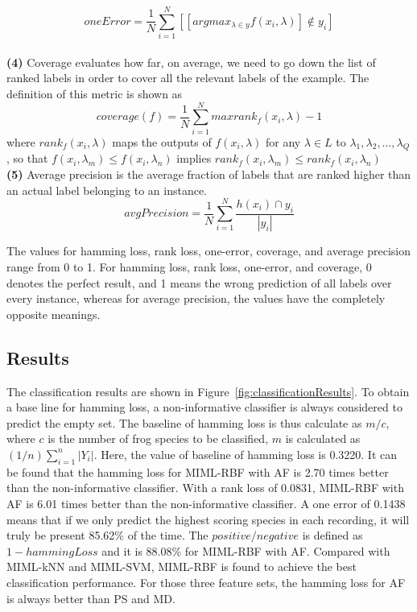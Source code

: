 \begin{equation}
oneError = \frac{1}{N}\sum_{i=1}^{N}[[argmax_{\lambda \in y} f(x_{i},\lambda)] \not \in y_{i} ]
\end{equation}
\\
\textbf{(4)} 
Coverage evaluates how far, on average, we need to go down
the list of ranked labels in order to cover all the relevant labels of the example. The definition of this metric is shown as
\begin{equation}
coverage(f)= \frac{1}{N}\sum_{i=1}^{N} max {rank_{f}(x_{i}, \lambda)-1}
\end{equation}
where $rank_{f}(x_{i}, \lambda)$ maps the outputs of $f(x_{i}, \lambda)$ for any
$\lambda \in L$ to ${\lambda_{1},\lambda_{2},...,\lambda_{Q}}$, so that 
$f(x_{i}, \lambda_{m}) \leq f(x_{i}, \lambda_{n})$ implies 
$rank_{f}(x_{i}, \lambda_{m}) \leq rank_{f}(x_{i}, \lambda_{n})$ 
\\
\textbf{(5)} 
Average precision is the average fraction of labels that are ranked higher than an actual label belonging to an instance. 
\begin{equation}
avgPrecision = \frac{1}{N}\sum_{i=1}^{N}\frac{h(x_{i}) \cap y_{i}}{|y_{i}|}
\end{equation}

The values for hamming loss, rank loss, one-error, coverage, and average precision range from 0 to 1. For hamming loss, rank loss, one-error, and coverage, 0 denotes the perfect result, and 1 means the wrong prediction of all labels over every instance, whereas for average precision, the values have the completely opposite meanings. 



\subsection{Results}

The classification results are shown in Figure~\ref{fig:classificationResults}. To obtain a base line for hamming loss, a non-informative classifier is always considered to predict the empty set. The baseline of hamming loss is thus calculate as $m/c$, where $c$ is the number of frog species to be classified, $m$ is calculated as $(1/n)\sum_{i=1}^{n}|Y_{i}|$. Here, the value of baseline of hamming loss is 0.3220. It can be found that the hamming loss for MIML-RBF with AF is 2.70 times better than the non-informative classifier. With a rank loss of 0.0831, MIML-RBF with AF is 6.01 times better than the non-informative classifier. A one error of 0.1438 means that if we only predict the highest scoring species in each recording, it will truly be present 85.62\% of the time. 
The $positive/negative$ is defined as $1-hammingLoss$ and it is 88.08\% for MIML-RBF with AF. Compared with MIML-kNN and MIML-SVM,  MIML-RBF is found to achieve the best classification performance. For those three feature sets, the hamming loss for AF is always better than PS and MD. 



